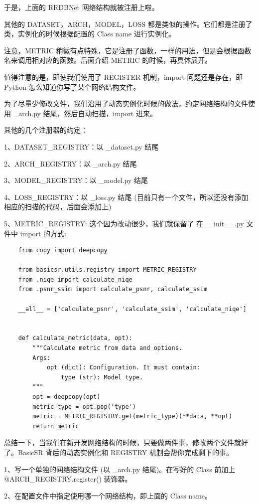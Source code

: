 \documentclass[../main.tex]{subfiles}
\begin{document}
    于是，上面的 RRDBNet 网络结构就被注册上啦。

    其他的 DATASET，ARCH，MODEL，LOSS 都是类似的操作。它们都是注册了类，实例化的时候根据配置的 Class name 进行实例化。

    注意，METRIC 稍微有点特殊，它是注册了函数，一样的用法，但是会根据函数名来调用相对应的函数。后面介绍 METRIC 的时候，再具体展开。

    值得注意的是，即使我们使用了 REGISTER 机制，import 问题还是存在，即 Python 怎么知道你写了某个网络结构文件。

    为了尽量少修改文件，我们沿用了动态实例化时候的做法，约定网络结构的文件使用  \_arch.py 结尾，然后自动扫描，import 进来。

    其他的几个注册器的约定：

    1、DATASET\_REGISTRY：以 \_dataset.py 结尾

    2、ARCH\_REGISTRY：以 \_arch.py 结尾

    3、MODEL\_REGISTRY：以 \_model.py 结尾

    4、LOSS\_REGISTRY：以 \_loss.py 结尾 (目前只有一个文件，所以还没有添加相应的扫描的代码，后面会添加上)

    5、METRIC\_REGISTRY: 这个因为改动很少，我们就保留了 在\_\_init\_\_.py 文件中 import 的方式:
    \begin{verbatim}
    from copy import deepcopy

    from basicsr.utils.registry import METRIC_REGISTRY
    from .niqe import calculate_niqe
    from .psnr_ssim import calculate_psnr, calculate_ssim

    __all__ = ['calculate_psnr', 'calculate_ssim', 'calculate_niqe']


    def calculate_metric(data, opt):
        """Calculate metric from data and options.
        Args:
            opt (dict): Configuration. It must contain:
                type (str): Model type.
        """
        opt = deepcopy(opt)
        metric_type = opt.pop('type')
        metric = METRIC_REGISTRY.get(metric_type)(**data, **opt)
        return metric
    \end{verbatim}

    总结一下，当我们在新开发网络结构的时候，只要做两件事，修改两个文件就好了。BasicSR 背后的动态实例化和 REGISTRY 机制会帮你完成剩下的事。

    1、写一个单独的网络结构文件 (以 \_arch.py 结尾)。在写好的 Class 前加上 @ARCH\_REGISTRY.register() 装饰器。

    2、在配置文件中指定使用哪一个网络结构，即上面的 Class name。
\end{document}
